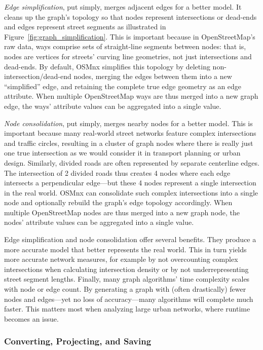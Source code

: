 \documentclass[12pt,letterpaper]{article} %
\begin{document}
\textit{Edge simplification}, put simply, merges adjacent edges for a better model. It cleans up the graph's topology so that nodes represent intersections or dead-ends and edges represent street segments as illustrated in Figure~\ref{fig:graph_simplification}. This is important because in OpenStreetMap's raw data, ways comprise sets of straight-line segments between nodes: that is, nodes are vertices for streets' curving line geometries, not just intersections and dead-ends. By default, OSMnx simplifies this topology by deleting non-intersection/dead-end nodes, merging the edges between them into a new \enquote{simplified} edge, and retaining the complete true edge geometry as an edge attribute. When multiple OpenStreetMap ways are thus merged into a new graph edge, the ways' attribute values can be aggregated into a single value.

\textit{Node consolidation}, put simply, merges nearby nodes for a better model. This is important because many real-world street networks feature complex intersections and traffic circles, resulting in a cluster of graph nodes where there is really just one true intersection as we would consider it in transport planning or urban design. Similarly, divided roads are often represented by separate centerline edges. The intersection of 2 divided roads thus creates 4 nodes where each edge intersects a perpendicular edge---but these 4 nodes represent a single intersection in the real world. OSMnx can consolidate such complex intersections into a single node and optionally rebuild the graph's edge topology accordingly. When multiple OpenStreetMap nodes are thus merged into a new graph node, the nodes' attribute values can be aggregated into a single value.

Edge simplification and node consolidation offer several benefits. They produce a more accurate model that better represents the real world. This in turn yields more accurate network measures, for example by not overcounting complex intersections when calculating intersection density or by not underrepresenting street segment lengths. Finally, many graph algorithms' time complexity scales with node or edge count. By generating a graph with (often drastically) fewer nodes and edges---yet no loss of accuracy---many algorithms will complete much faster. This matters most when analyzing large urban networks, where runtime becomes an issue.

\subsubsection{Converting, Projecting, and Saving}
\end{document}
